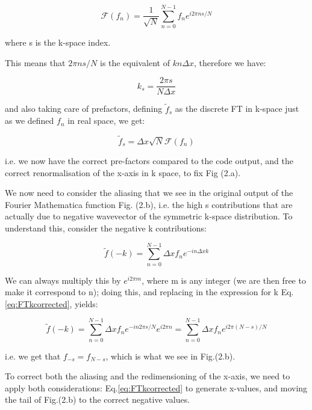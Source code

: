 \documentclass[a4paper,nobalancelastpage]{revtex4-1}
\begin{document}
\begin{equation}
\mathcal{F}(f_n)=
\frac{1}{\sqrt{N}} \sum_{n=0}^{N-1} f_n e^{i 2 \pi n s/N}
\end{equation}

where s is the k-space index.

This means that $2 \pi n s/N$ is the equivalent of $k n \Delta x$, therefore we have:

\begin{equation}
\label{eq:FTkcorrected}
k_s=\frac{2 \pi s}{N \Delta x}
\end{equation}

and also taking care of prefactors, defining $\tilde{f}_s$ as the discrete FT in k-space just as we defined $f_n$ in real space, we get:

\begin{equation}
\tilde{f}_s=\Delta x \sqrt{N} \mathcal{F}(f_n)
\end{equation}

i.e. we now have the correct pre-factors compared to the code output, and the correct renormalisation of the x-axis in k space, to fix Fig (2.a).

We now need to consider the aliasing that we see in the original output of the Fourier Mathematica function Fig. (2.b), i.e. the high s contributions that are actually due to negative wavevector of the symmetric k-space distribution. To understand this, consider the negative k contributions:

\begin{equation}
\tilde{f}(-k)=\sum_{n=0}^{N-1} \Delta x f_n e^{-in\Delta x k}
\end{equation}

We can always multiply this by $e^{i 2 \pi m}$, where m is any integer (we are then free to make it correspond to n); doing this, and replacing in the expression for k Eq.\ref{eq:FTkcorrected}, yields:

\begin{equation}
\tilde{f}(-k)=\sum_{n=0}^{N-1} \Delta x f_n e^{-i n 2 \pi s/N}e^{i 2 \pi n}=\sum_{n=0}^{N-1} \Delta x f_n e^{i 2\pi (N-s)/N }
\end{equation}

i.e. we get that $f_{-s}=f_{N-s}$, which is what we see in Fig.(2.b).

To correct both the aliasing and the redimensioning of the x-axis, we need to apply both considerations: Eq.\ref{eq:FTkcorrected} to generate x-values, and moving the tail of Fig.(2.b) to the correct negative values. 
\end{document}
